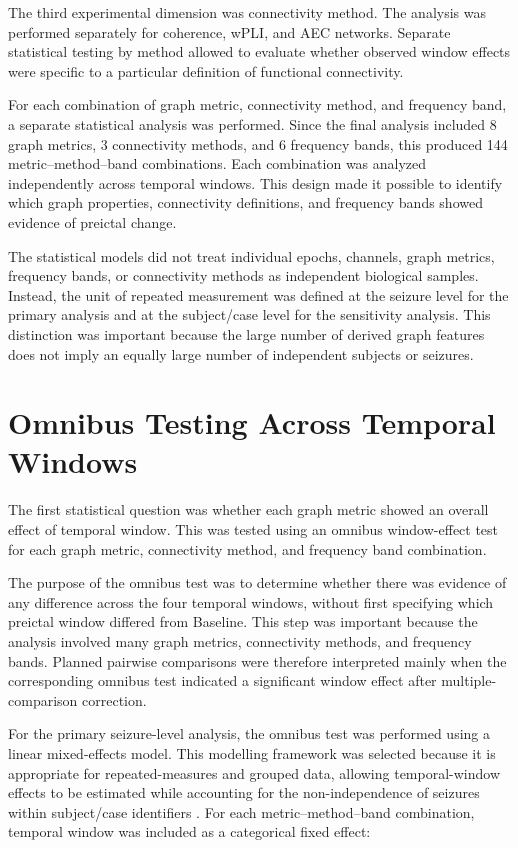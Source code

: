 The third experimental dimension was connectivity method. The analysis was
performed separately for coherence, wPLI, and AEC networks.
Separate statistical testing by method allowed to evaluate whether
observed window effects were specific to a particular definition of functional
connectivity.

For each combination of graph metric, connectivity method, and frequency band,
a separate statistical analysis was performed. Since the final analysis
included \num{8} graph metrics, \num{3} connectivity methods, and \num{6}
frequency bands, this produced \num{144} metric--method--band combinations. Each combination was analyzed independently
across temporal windows. This design made it possible to identify which graph
properties, connectivity definitions, and frequency bands showed evidence of
preictal change.

The statistical models did not treat individual epochs, channels, graph
metrics, frequency bands, or connectivity methods as independent biological
samples. Instead, the unit of repeated measurement was defined at the seizure
level for the primary analysis and at the subject/case level for the
sensitivity analysis. This distinction was important because the large number
of derived graph features does not imply an equally large number of independent
subjects or seizures.

\section{Omnibus Testing Across Temporal Windows}
\label{sec:omnibus-testing-temporal-windows}

The first statistical question was whether each graph metric showed an overall
effect of temporal window. This was tested using an omnibus window-effect test
for each graph metric, connectivity method, and frequency band combination.

The purpose of the omnibus test was to determine whether there was evidence of
any difference across the four temporal windows, without first specifying which
preictal window differed from Baseline. This step was important because the
analysis involved many graph metrics, connectivity methods, and frequency
bands. Planned pairwise comparisons were therefore interpreted mainly when the
corresponding omnibus test indicated a significant window effect after
multiple-comparison correction.

For the primary seizure-level analysis, the omnibus test was performed using a
linear mixed-effects model. This modelling framework was selected because it is
appropriate for repeated-measures and grouped data, allowing temporal-window
effects to be estimated while accounting for the non-independence of seizures
within subject/case identifiers \cite{Laird1982,Pinheiro2000}. For each metric--method--band
combination, temporal window was included as a categorical fixed effect:

